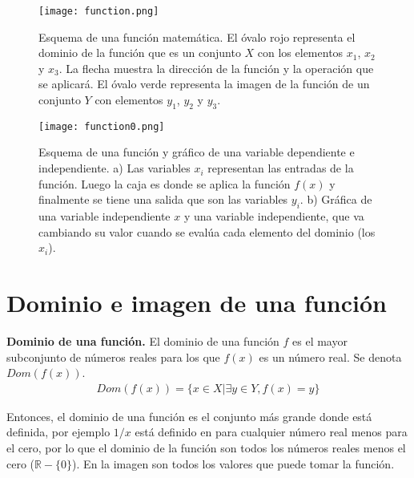 \begin{center}
\begin{figure}[h!]
\centering
\texttt{[image: function.png]}
\caption[Esquema de una función matemática.]{Esquema de una función matemática. El óvalo rojo representa el dominio de la función que es un conjunto $X$ con los elementos $x_{1}$, $x_{2}$ y $x_{3}$. La flecha muestra la dirección de la función y la operación que se aplicará. El óvalo verde representa la imagen de la función de un conjunto $Y$ con elementos $y_{1}$, $y_{2}$ y $y_{3}$.}
\label{fn00}
\end{figure}
\end{center}

\begin{center}
\begin{figure}[h!]
\centering
\texttt{[image: function0.png]}
\caption[Esquema de una función y gráfico de una variable dependiente e independiente.]{Esquema de una función y gráfico de una variable dependiente e independiente. a) Las variables $x_{i}$ representan las entradas de la función. Luego la caja es donde se aplica la función $f(x)$ y finalmente se tiene una salida que son las variables $y_{i}$. b) Gráfica de una variable independiente $x$ y una variable independiente, que va cambiando su valor cuando se evalúa cada elemento del dominio (los $x_{i}$).}
\label{imagfx}
\end{figure}
\end{center}

\section{Dominio e imagen de una función}
\label{domim}
\begin{mydef}
\textbf{Dominio de una función.} El dominio de una función $f$ es el mayor subconjunto de números reales para los que $f(x)$ es un número real. Se denota $Dom(f(x))$.
\begin{eqnarray}
Dom(f(x))=\{x\in X|\exists y \in Y,f(x)=y\}
\end{eqnarray}
\label{domfx}
\end{mydef}
Entonces, el dominio de una función es el conjunto más grande donde está definida, por ejemplo $1/x$ está definido en para cualquier número real menos para el cero, por lo que el dominio de la función son todos los números reales menos el cero ($\mathbb{R}-\{0\}$). En la imagen son todos los valores que puede tomar la función.

